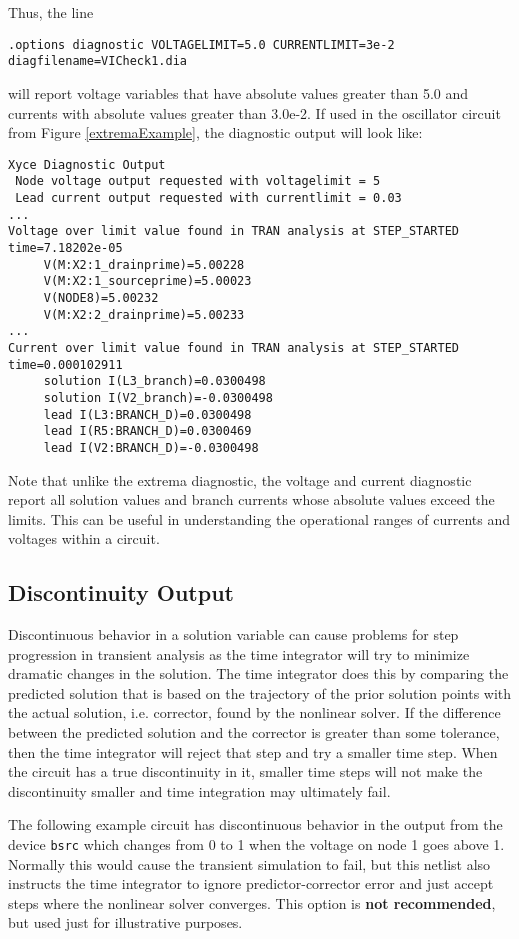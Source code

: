 Thus, the line
\begin{verbatim}
.options diagnostic VOLTAGELIMIT=5.0 CURRENTLIMIT=3e-2 diagfilename=VICheck1.dia
\end{verbatim}
will report voltage variables that have absolute values greater than 5.0 and currents
with absolute values greater than 3.0e-2.  If used in the oscillator circuit from 
Figure \ref{extremaExample}, the diagnostic output will look like:

\begin{verbatim}
Xyce Diagnostic Output
 Node voltage output requested with voltagelimit = 5
 Lead current output requested with currentlimit = 0.03
...
Voltage over limit value found in TRAN analysis at STEP_STARTED time=7.18202e-05
     V(M:X2:1_drainprime)=5.00228
     V(M:X2:1_sourceprime)=5.00023
     V(NODE8)=5.00232
     V(M:X2:2_drainprime)=5.00233
...
Current over limit value found in TRAN analysis at STEP_STARTED time=0.000102911
     solution I(L3_branch)=0.0300498
     solution I(V2_branch)=-0.0300498
     lead I(L3:BRANCH_D)=0.0300498
     lead I(R5:BRANCH_D)=0.0300469
     lead I(V2:BRANCH_D)=-0.0300498
\end{verbatim}

\noindent Note that unlike the extrema diagnostic, the voltage and current diagnostic report all 
solution values and branch currents whose absolute values exceed the limits.  This can
be useful in understanding the operational ranges of currents and voltages within a circuit.

\subsection{Discontinuity Output}
Discontinuous behavior in a solution variable can cause problems for step progression 
in transient analysis as the time integrator will try to minimize dramatic changes 
in the solution.  The time integrator does this by comparing the predicted solution 
that is based on the trajectory of the prior solution points with the actual solution, i.e. corrector, 
found by the nonlinear solver.  If the difference between the predicted solution and the corrector 
is greater than some tolerance, then the time integrator
will reject that step and try a smaller time step.  When the circuit has a true 
discontinuity in it, smaller time steps will not make the discontinuity smaller and 
time integration may ultimately fail.

The following example circuit has discontinuous behavior in the output from 
the device \texttt{bsrc} which changes from 0 to 1 when the voltage on node 1 goes 
above 1.  Normally this would cause the transient simulation to fail, but this netlist
also instructs the time integrator to ignore predictor-corrector error and just 
accept steps where the nonlinear solver converges.  This option is {\bf not recommended}, 
but used just for illustrative purposes.  

